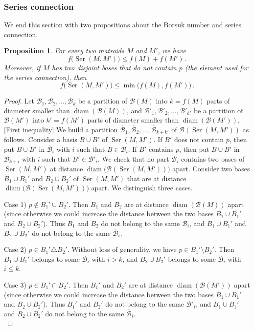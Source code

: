 \documentclass[12pt]{amsart}
\theoremstyle{plain}
\newtheorem{proposition}[theorem]{Proposition}
\theoremstyle{definition}
\theoremstyle{remark}
\renewcommand{\leq}{\leqslant}
\newcommand{\diame}{\mathsf{diam}}
\newcommand{\Ser}{\operatorname{Ser}}
\def \diame {\operatorname{diam}}
\def \B {\mathcal{B}}
\begin{document}
\subsubsection{Series connection}

We end this section with two propositions about the Borsuk number and series connection.

\begin{proposition}\label{prop:ser}
For every two matroids $M$ and $M'$, we have \[
f\bigl(\Ser(M,M')\bigr) \leq f(M) + f(M') \, .
\] Moreover, if $M$ has two disjoint bases that do not contain $p$ (the element used for the series connection), then
\[
f\bigl(\Ser(M,M')\bigr) \leq \min\bigl(f(M),f(M')\bigr) \, .
\]
\end{proposition}

\begin{proof}
Let $\B_1,\B_2,\ldots,\B_k$ be a partition of $\B(M)$ into $k=f(M)$ parts of diameter smaller than $\diame(\B(M))$, and $\B'_1,\B'_2,\ldots,\B'_{k'}$ be a partition of $\B(M')$ into $k'=f(M')$ parts of diameter smaller than $\diame(\B(M'))$. \\


[First inequality] We build a partition $\overline{\B}_1,\overline{\B}_2,\ldots,\overline{\B}_{k+k'}$ of $\B(\Ser(M,M'))$ as follows. Consider a basis $B \cup B'$ of $\Ser(M,M')$. If $B'$ does not contain $p$, then put $B \cup B'$ in $\overline{\B}_i$ with $i$ such that $B \in \B_i$. If $B'$ contains $p$, then put $B \cup B'$ in $\overline{\B}_{k+i}$ with $i$ such that $B' \in \B'_i$. We check that no part $\overline{\B}_i$ contains two bases of $\Ser(M,M')$ at distance $\diame\bigl(\B(\Ser(M,M'))\bigr)$ apart. Consider two bases $B_1 \cup B_1'$ and $B_2 \cup B_2'$ of $\Ser(M,M')$ that are at distance $\diame\bigl(\B(\Ser(M,M'))\bigr)$ apart. We distinguish three cases.

Case 1) $p \notin B_1' \cup B_2'$. Then $B_1$ and $B_2$ are at distance $\diame(\B(M))$ apart (since otherwise we could increase the distance between the two bases $B_1 \cup B_1'$ and $B_2 \cup B_2'$). Thus $B_1$ and $B_2$ do not belong to the same $\B_i$, and $B_1 \cup B_1'$ and $B_2 \cup B_2'$ do not belong to the same $\overline{\B}_i$.

Case 2) $p \in B_1' \triangle B_2'$. Without loss of generality, we have $p \in B_1' \setminus B_2'$. Then $B_1 \cup B_1'$ belongs to some $\overline{\B}_i$ with $i > k$, and $B_2 \cup B_2'$ belongs to some $\overline{\B}_i$ with $i \leq k$.

Case 3) $p \in B_1' \cap B_2'$. Then $B_1'$ and $B_2'$ are at distance $\diame(\B(M'))$ apart (since otherwise we could increase the distance between the two bases $B_1 \cup B_1'$ and $B_2 \cup B_2'$). Thus $B_1'$ and $B_2'$ do not belong to the same $\B'_i$, and $B_1 \cup B_1'$ and $B_2 \cup B_2'$ do not belong to the same $\overline{\B}_i$.\\


\end{proof}
\end{document}
